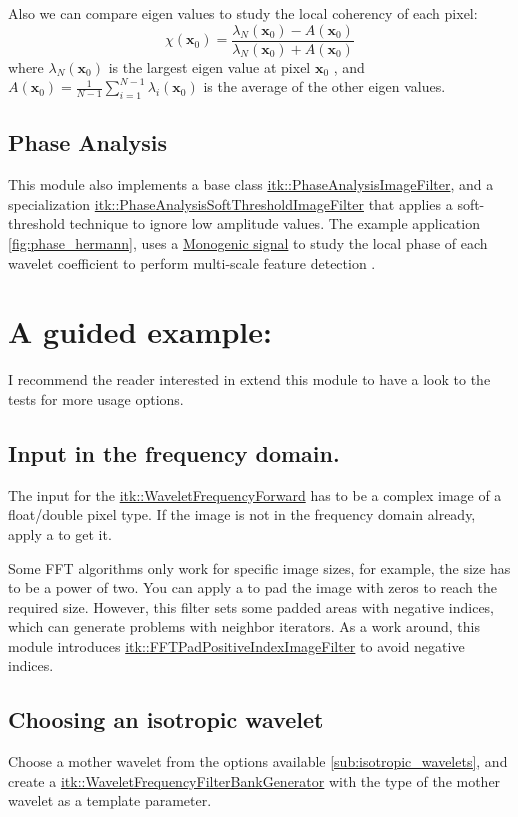 \documentclass{InsightArticle}
\newcommand{\github}[1]{\href{https://github.com/phcerdan/ITKIsotropicWavelets/blob/master/include/itk#1.h}{itk::#1}}
\theoremstyle{definition}
\begin{document}
 Also we can compare eigen values to study the local coherency of each pixel:
 $$
 \chi (\mathbf{x}_0)= \frac{\lambda_N(\mathbf{x}_0) - A(\mathbf{x}_0)}{\lambda_N(\mathbf{x}_0) + A(\mathbf{x}_0)}
 $$
where $\lambda_N(\mathbf{x}_0)$ is the largest eigen value at pixel $\mathbf{x}_0$ ,
and
$A(\mathbf{x}_0) = \frac{1}{N-1}\sum_{i=1}^{N-1}\lambda_i(\mathbf{x}_0)$ is the average of the other eigen values.

\subsection{Phase Analysis}
\label{sub:phase_analyzers}

This module also implements a base class \github{PhaseAnalysisImageFilter}, and a specialization \github{PhaseAnalysisSoftThresholdImageFilter} that applies a soft-threshold technique to ignore low amplitude values. The example application \ref{fig:phase_hermann}, uses a \hyperref[sub:monogenic]{Monogenic signal} to study the local phase of each wavelet coefficient to perform multi-scale feature detection \cite{felsberg_monogenic_2001,unser_multiresolution_2009}.

\section{A guided example:}
I recommend the reader interested in extend this module to have a look to the tests for more usage options.
\subsection{Input in the frequency domain.}
The input for the \github{WaveletFrequencyForward} has to be a complex image of a float/double pixel type. If the image is not in the frequency domain already, apply a  to get it.

Some FFT algorithms only work for specific image sizes, for example, the size has to be a power of two.
You can apply a  to pad the image with zeros to reach the required size. However, this filter sets some padded areas with negative indices, which can generate problems with neighbor iterators.
As a work around, this module introduces \github{FFTPadPositiveIndexImageFilter} to avoid negative indices.

\subsection{Choosing an isotropic wavelet}
\label{sub:Choosing}
Choose a mother wavelet from the options available \ref{sub:isotropic_wavelets}, and create a
\github{WaveletFrequencyFilterBankGenerator} with the type of the mother wavelet as a template parameter.
\end{document}

